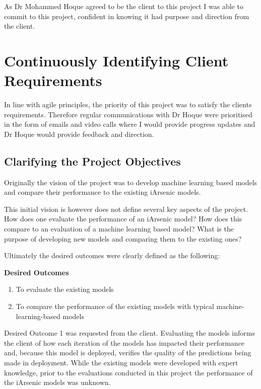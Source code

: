 As Dr Mohammed Hoque agreed to be the client to this project I was able to commit to this project, confident in knowing it had purpose and direction from the client.

\section{Continuously Identifying Client Requirements}

In line with agile principles, the priority of this project was to satisfy the clients requirements. Therefore regular communications with Dr Hoque were prioritised in the form of emails and video calls where I would provide progress updates and Dr Hoque would provide feedback and direction. 

\subsection{Clarifying the Project Objectives}

Originally the vision of the project was to develop machine learning based models and compare their performance to the existing iArsenic models.

This initial vision is however does not define several key aspects of the project. How does one evaluate the performance of an iArsenic model? How does this compare to an evaluation of a machine learning based model? What is the purpose of developing new models and comparing them to the existing ones?

Ultimately the desired outcomes were clearly defined as the following:

\textbf{Desired Outcomes}

\begin{enumerate}
  \label{desired_outcomes}
  \item To evaluate the existing models
  \item To compare the performance of the existing models with typical machine-learning-based models
\end{enumerate}

Desired Outcome 1 was requested from the client. Evaluating the models informs the client of how each iteration of the models has impacted their performance and, because this model is deployed, verifies the quality of the predictions being made in deployment.  While the existing models were developed with expert knowledge, prior to the evaluations conducted in this project the performance of the iArsenic models was unknown.

